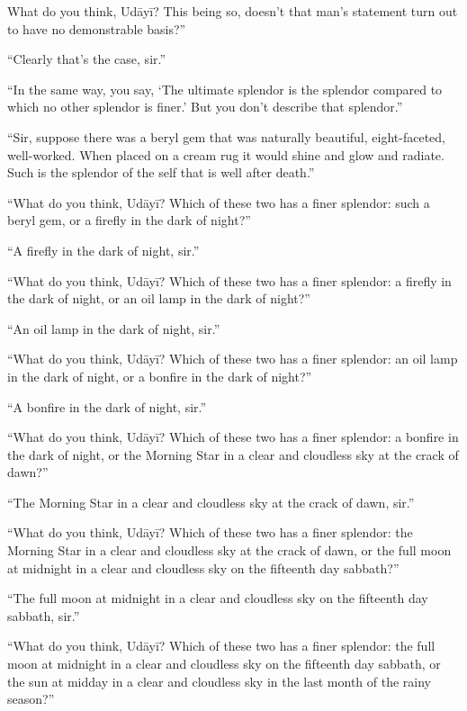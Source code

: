 \documentclass[12pt,openany]{book}%
\begin{document}
What do you think, \textsanskrit{Udāyī}? This being so, doesn’t that man’s statement turn out to have no demonstrable basis?” 

“Clearly that’s the case, sir.” 

“In the same way, you say, ‘The ultimate splendor is the splendor compared to which no other splendor is finer.’ But you don’t describe that splendor.” 

“Sir, suppose there was a beryl gem that was naturally beautiful, eight-faceted, well-worked. When placed on a cream rug it would shine and glow and radiate. Such is the splendor of the self that is well after death.” 

“What do you think, \textsanskrit{Udāyī}? Which of these two has a finer splendor: such a beryl gem, or a firefly in the dark of night?” 

“A firefly in the dark of night, sir.” 

“What do you think, \textsanskrit{Udāyī}? Which of these two has a finer splendor: a firefly in the dark of night, or an oil lamp in the dark of night?” 

“An oil lamp in the dark of night, sir.” 

“What do you think, \textsanskrit{Udāyī}? Which of these two has a finer splendor: an oil lamp in the dark of night, or a bonfire in the dark of night?” 

“A bonfire in the dark of night, sir.” 

“What do you think, \textsanskrit{Udāyī}? Which of these two has a finer splendor: a bonfire in the dark of night, or the Morning Star in a clear and cloudless sky at the crack of dawn?” 

“The Morning Star in a clear and cloudless sky at the crack of dawn, sir.” 

“What do you think, \textsanskrit{Udāyī}? Which of these two has a finer splendor: the Morning Star in a clear and cloudless sky at the crack of dawn, or the full moon at midnight in a clear and cloudless sky on the fifteenth day sabbath?” 

“The full moon at midnight in a clear and cloudless sky on the fifteenth day sabbath, sir.” 

“What do you think, \textsanskrit{Udāyī}? Which of these two has a finer splendor: the full moon at midnight in a clear and cloudless sky on the fifteenth day sabbath, or the sun at midday in a clear and cloudless sky in the last month of the rainy season?” 
\end{document}
